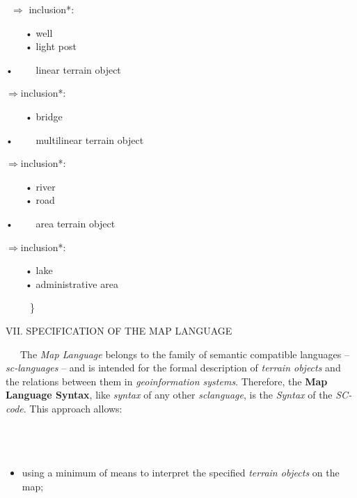 \documentclass{article}
\begin{document}
\begin{multicols}{2}
\begin{adjustwidth}{15mm}{}
\begin{itemize}
    \begin{itemize}
        \ \(\Rightarrow\) inclusion*:\\
        \begin{itemize}
     \ \ \ \ • well\\
       \ \ \ \      • light post
        \end{itemize}
    \end{itemize}
    • \ \ \ \ linear terrain object
    \begin{itemize}
         \(\Rightarrow\)inclusion*:\\
        \begin{itemize}
            \ \ \ \ • bridge
        \end{itemize}
    \end{itemize}
    • \ \ \ \ multilinear terrain object
    \begin{itemize}
         \(\Rightarrow\)inclusion*:\\
        \begin{itemize}
        \ \ \ \  • river\\
        \ \ \ \ • road
        \end{itemize}
    \end{itemize}
    • \ \ \ \ area terrain object
    \begin{itemize}
         \(\Rightarrow\)inclusion*:\\
        \begin{itemize}
           \ \ \ \  • lake\\
          \ \ \ \  • administrative area
        \end{itemize}
    \end{itemize}
\end{itemize}
\ \ \ \ \ \}
\end{adjustwidth}
\begin{center}
 VII. SPECIFICATION OF THE MAP LANGUAGE
 \end{center}
\ \ \ The \textit{Map Language} belongs to the family of semantic
compatible languages – \textit{sc-languages} – and is intended for
the formal description of \textit{terrain objects} and the relations
between them in \textit{geoinformation systems}. Therefore, the
\textbf{Map Language Syntax}, like \textit{syntax} of any other \textit{sclanguage}, is the \textit{Syntax} of the \textit{SC-code}. This approach
allows:\\
\ \\ \ \\ \ 
	\begin{itemize}
		\item using a minimum of means to interpret the specified
\textit{terrain objects} on the map;


\end{itemize}
\end{multicols}
\end{document}
